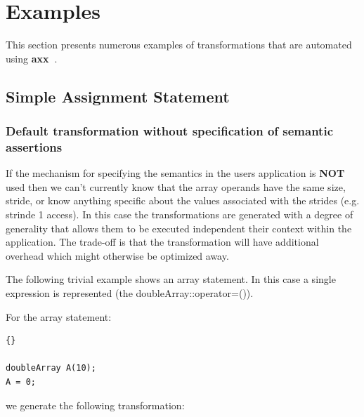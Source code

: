 \documentclass[10pt]{article}
\newcommand{\axx}{{\bf axx\ }}
\begin{document}
\section{Examples}
    This section presents numerous examples of transformations that are automated using \axx.

\subsection{Simple Assignment Statement}

\subsubsection{Default transformation without specification of semantic assertions}

    If the mechanism for specifying the semantics in the users application is {\bf NOT} used then we
can't currently know that the array operands have the same size, stride, or know anything specific
about the values associated with the strides (e.g. strinde 1 access).  In this case the
transformations are generated with a degree of generality that allows them to be executed
independent their context within the application.  The trade-off is that the transformation will
have additional overhead which might otherwise be optimized away.


   The following trivial example shows an array statement.  In this case a single expression is represented
(the doubleArray::operator=()).

   For the array statement:
\vspace{0.5in}

\begin{lstlisting}{}

doubleArray A(10);
A = 0;

\end{lstlisting}


   we generate the following transformation:

\vspace{0.5in}
\end{document}
